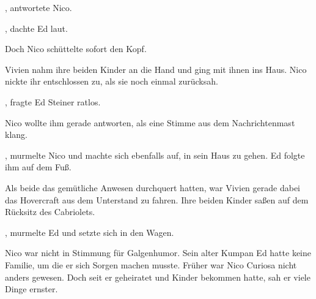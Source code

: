 \par

, antwortete Nico. 

\par

, dachte Ed laut.

\par

Doch Nico schüttelte sofort den Kopf. 

\par

Vivien nahm ihre beiden Kinder an die Hand und ging mit ihnen ins Haus. Nico nickte ihr entschlossen zu, als sie noch einmal zurücksah.

\par

, fragte Ed Steiner ratlos.

\par

Nico wollte ihm gerade antworten, als eine Stimme aus dem Nachrichtenmast klang. 

\par

, murmelte Nico und machte sich ebenfalls auf, in sein Haus zu gehen. Ed folgte ihm auf dem Fuß.

\par

Als beide das gemütliche Anwesen durchquert hatten, war Vivien gerade dabei das Hovercraft aus dem Unterstand zu fahren. Ihre beiden Kinder saßen auf dem Rücksitz des Cabriolets.

\par

, murmelte Ed und setzte sich in den Wagen.

\par

Nico war nicht in Stimmung für Galgenhumor. Sein alter Kumpan Ed hatte keine Familie, um die er sich Sorgen machen musste. Früher war Nico Curiosa nicht anders gewesen. Doch seit er geheiratet und Kinder bekommen hatte, sah er viele Dinge ernster.

